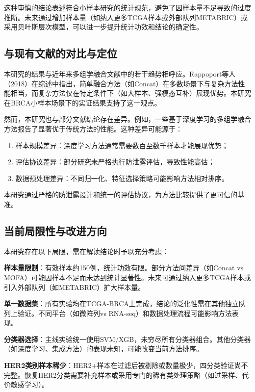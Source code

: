 这种审慎的结论表述符合小样本研究的统计规范，避免了因样本量不足导致的过度推断。未来通过增加样本量（如纳入更多TCGA样本或外部队列METABRIC）或采用贝叶斯层次模型，可以进一步提升统计功效和结论的确定性。

\subsection{与现有文献的对比与定位}

本研究的结果与近年来多组学融合文献中的若干趋势相呼应。Rappoport等人（2018）在综述中指出，简单融合方法（如Concat）在多数场景下与复杂方法性能相当，而复杂方法仅在特定条件下（如大样本、强模态互补）展现优势。本研究在BRCA小样本场景下的实证结果支持了这一观点。

然而，本研究也与部分文献结论存在差异。例如，一些基于深度学习的多组学融合方法报告了显著优于传统方法的性能。这种差异可能源于：
\begin{enumerate}
    \item 样本规模差异：深度学习方法通常需要数百至数千样本才能展现优势；
    \item 评估协议差异：部分研究未严格执行防泄露评估，导致性能高估；
    \item 数据预处理差异：不同归一化、特征选择策略可能影响方法相对排序。
\end{enumerate}

本研究通过严格的防泄露设计和统一的评估协议，为方法比较提供了更可信的基准。

\subsection{当前局限性与改进方向}

本研究存在以下局限，需在解读结论时予以充分考虑：

\textbf{样本量限制}：有效样本约150例，统计功效有限。部分方法间差异（如Concat vs MOFA）可能因样本不足而未达到统计显著性。未来可通过纳入更多TCGA样本或引入外部队列（如METABRIC）扩大样本量。

\textbf{单一数据集}：所有实验均在TCGA-BRCA上完成，结论的泛化性需在其他独立队列上验证。不同平台（如微阵列vs RNA-seq）和数据处理流程可能影响方法表现。

\textbf{分类器选择}：主线实验统一使用SVM/XGB，未穷尽所有分类器组合。其他分类器（如深度学习、集成方法）的表现未知，可能改变当前方法排序。

\textbf{HER2类别样本稀少}：HER2+样本在过滤后被剔除或数量极少，四分类验证尚不完整。恢复HER2分类需要补充样本或采用专门的稀有类处理策略（如过采样、代价敏感学习）。


